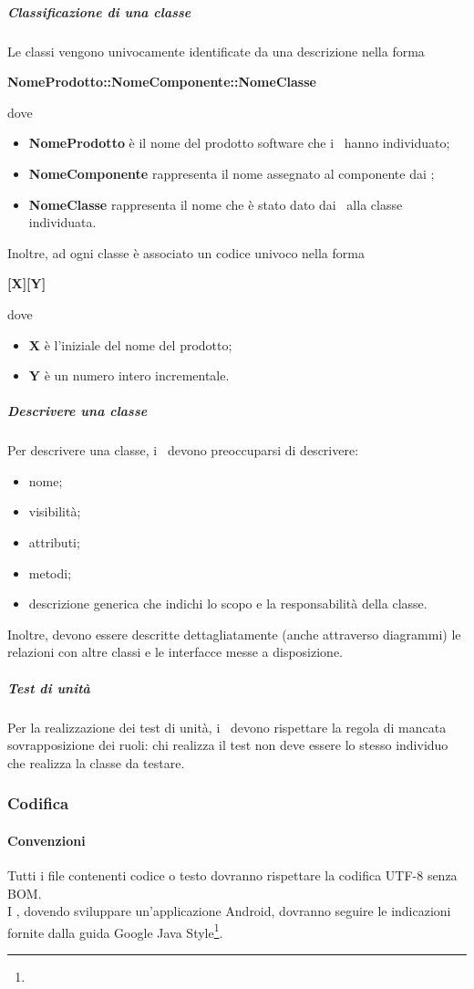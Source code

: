 \documentclass[../NormeProgetto.tex]{subfiles}
\begin{document}
			\subparagraph{Classificazione di una classe}
				Le classi vengono univocamente identificate da una descrizione nella forma \begin{center}
				\textbf{NomeProdotto::NomeComponente::NomeClasse}
				\end{center} dove
				\begin{itemize}
					\item \textbf{NomeProdotto} è il nome del prodotto software che i \progettisti\ hanno individuato;
					\item \textbf{NomeComponente} rappresenta il nome assegnato al componente dai \progettisti;
					\item \textbf{NomeClasse} rappresenta il nome che è stato dato dai \progettisti\ alla classe individuata.
				\end{itemize}
				Inoltre, ad ogni classe è associato un codice univoco nella forma \begin{center}
				\textbf{[X][Y]}
				\end{center} dove
				\begin{itemize}
					\item \textbf{X} è l'iniziale del nome del prodotto;
					\item \textbf{Y} è un numero intero incrementale.
				\end{itemize}
			\subparagraph{Descrivere una classe}			
				Per descrivere una classe, i \progettisti\ devono preoccuparsi di descrivere:
				\begin{itemize}
					\item nome;
					\item visibilità;
					\item attributi;
					\item metodi;
					\item descrizione generica che indichi lo scopo e la responsabilità della classe.
				\end{itemize}
				Inoltre, devono essere descritte dettagliatamente (anche attraverso diagrammi) le relazioni con altre classi e le interfacce messe a disposizione.
			\subparagraph{Test di unità}
				Per la realizzazione dei test di unità, i \progettisti\ devono rispettare la regola di mancata sovrapposizione dei ruoli: chi realizza il test non deve essere lo stesso individuo che realizza la classe da testare.
		\subsubsection{Codifica}
			\paragraph{Convenzioni}
				Tutti i file contenenti codice o testo dovranno rispettare la codifica UTF-8 senza BOM.\\
				I \programmatori, dovendo sviluppare un'applicazione Android, dovranno seguire le indicazioni fornite dalla guida Google Java Style\footnote{}.
\end{document}
